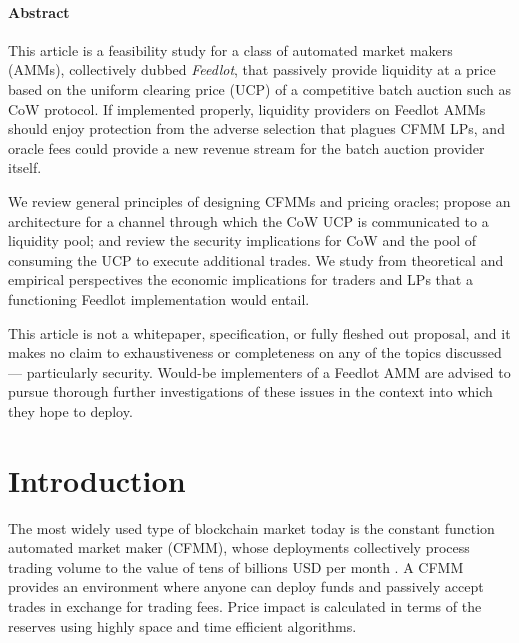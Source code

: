 \documentclass[a4paper,10pt]{article}
\theoremstyle{remark}
\begin{document}
\maketitle
\printsplash

\paragraph{Abstract}

This article is a feasibility study for a class of automated market makers (AMMs), collectively dubbed \emph{Feedlot}, that passively provide liquidity at a price based on the uniform clearing price (UCP) of a competitive batch auction such as CoW protocol.
%
If implemented properly, liquidity providers on Feedlot AMMs should enjoy protection from the adverse selection that plagues CFMM LPs, and oracle fees could provide a new revenue stream for the batch auction provider itself.

We review general principles of designing CFMMs and pricing oracles; propose an architecture for a channel through which the CoW UCP is communicated to a liquidity pool; and review the security implications for CoW and the pool of consuming the UCP to execute additional trades. We study from theoretical and empirical perspectives the economic implications for traders and LPs that a functioning Feedlot implementation would entail.

This article is not a whitepaper, specification, or fully fleshed out proposal, and it makes no claim to exhaustiveness or completeness on any of the topics discussed --- particularly security. 
%
Would-be implementers of a Feedlot AMM are advised to pursue thorough further investigations of these issues in the context into which they hope to deploy.

\section{Introduction}

The most widely used type of blockchain market today is the constant function automated market maker (CFMM), whose deployments collectively process trading volume to the value of tens of billions USD per month \cite{buterin2016lets, adams2020uniswap, oneill2023can}.
%
A CFMM provides an environment where anyone can deploy funds and passively accept trades in exchange for trading fees.
%
Price impact is calculated in terms of the reserves using highly space and time efficient algorithms.
\end{document}
